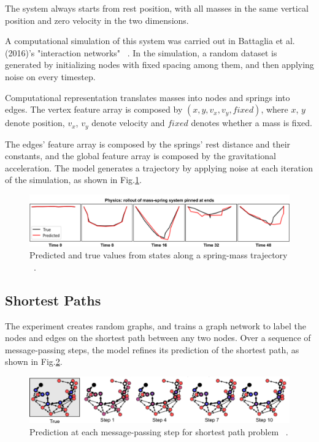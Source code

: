 The system always starts from rest position, with all masses in the same vertical position and zero velocity in the two dimensions.

A computational simulation of this system was carried out in Battaglia et al. (2016)'s "interaction networks" ~\cite{Bataglia_2016}. In the simulation, a random dataset is generated by initializing nodes with fixed spacing among them, and then applying noise on every timestep.

Computational representation translates masses into nodes and springs into edges. The vertex feature array is composed by $(x, y, v_x, v_y, fixed)$, where $x$, $y$ denote position, $v_x$, $v_y$ denote velocity and $fixed$ denotes whether a mass is fixed.

The edges’ feature array is composed by the springs’ rest distance and their constants, and the global feature array is composed by the gravitational acceleration. The model generates a trajectory by applying noise at each iteration of the simulation, as shown in Fig.\ref{fig:physics_trajectory}.

\begin{figure}[H]
    \centering
    \includegraphics[width=.7\textwidth]{fig/content/analysed_problems/physics/tragectory.png}
    \caption{Predicted and true values from states along a spring-mass trajectory ~\cite{Battaglia_2018}.}
    \label{fig:physics_trajectory}
\end{figure}


\subsection{Shortest Paths}

The experiment creates random graphs, and trains a graph network to label the nodes and edges on the shortest path between any two nodes. Over a sequence of message-passing steps, the model refines its prediction of the shortest path, as shown in Fig.\ref{fig:shortest_path}.

\begin{figure}[H]
    \centering
    \includegraphics[width=\textwidth]{fig/content/analysed_problems/shortest_paths/steps.png}
    \caption{Prediction at each message-passing step for shortest path problem ~\cite{Battaglia_2018}.}
    \label{fig:shortest_path}
\end{figure}


